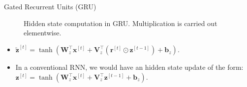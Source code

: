 \begin{vbframe}{Gated Recurrent Units (GRU)}
     \begin{figure}
      \centering
      \caption{\footnotesize{Hidden state computation in GRU. Multiplication is carried out elementwise.}}
  \end{figure}
  \begin{itemize}

  \item  $\tilde{\mathbf{z}}^{[t]} = \tanh(\mathbf{W}_{z}^\top \mathbf{x}^{[t]} + \mathbf{V}_{z}^\top \left(\mathbf{r}^{[t]} \odot \mathbf{z}^{[t-1]}\right)  + \mathbf{b}_z).$
   \item In a conventional RNN, we would have an hidden state update of the form:  $\mathbf{z}^{[t]} = \tanh(\mathbf{W}_{z}^\top \mathbf{x}^{[t]} + \mathbf{V}_{z}^\top \mathbf{z}^{[t-1]} + \mathbf{b}_z).$
   \end{itemize}
  
\end{vbframe}
